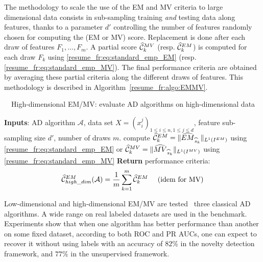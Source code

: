 %
The methodology to scale the use of the EM and MV criteria to large dimensional data consists in sub-sampling training \emph{and} testing data along features, thanks to a parameter $d'$ controlling the number of features randomly chosen for computing the (EM or MV) score. Replacement is done after each draw of features $F_1,\ldots,F_{m}$. A partial score $\widehat {\mathcal{C}}_k^{MV}$ (resp. $\widehat {\mathcal{C}}_k^{EM}$) is computed for each draw $F_k$ using \eqref{resume_fr:eq:standard_emp_EM} (resp. \eqref{resume_fr:eq:standard_emp_MV}). The final performance criteria are obtained by averaging these partial criteria along the different draws of features. This methodology is described in Algorithm~\ref{resume_fr:algo:EMMV}.
%
\begin{algorithm}[!tbh]
\caption{~~High-dimensional EM/MV: evaluate AD algorithms on high-dimensional data}
\label{resume_fr:algo:EMMV}
\begin{algorithmic}
  \STATE \textbf{Inputs}: AD algorithm $\mathcal{A}$, data set $X = (x^j_i)_{1 \le i \le n, 1 \le j \le d }$, feature sub-sampling size $d'$, number of draws $m$.
    \STATE compute $\widehat{\mathcal{C}}_k^{EM} = \| \widehat{EM}_{\widehat s_k} \|_{L^1(I^{EM})}$ using \eqref{resume_fr:eq:standard_emp_EM} or $\widehat{\mathcal{C}}_k^{MV} = \| \widehat{MV}_{\widehat s_k} \|_{L^1(I^{MV})}$ using \eqref{resume_fr:eq:standard_emp_MV}
  \ENDFOR 
  \STATE \textbf{Return} performance criteria: $$\widehat{\mathcal{C}}^{EM}_{high\_dim} (\mathcal{A})= \frac{1}{m} \sum_{k=1}^m\widehat {\mathcal{C}}_k^{EM} \text{~~~~(idem for MV)}$$
\end{algorithmic}
\end{algorithm}

Low-dimensional and high-dimensional EM/MV are tested \wrt~three classical AD algorithms. A wide range on real labeled datasets are used in the benchmark.
Experiments show that when one algorithm has %
better performance than another on some fixed dataset, according to both ROC and PR AUCs, one can expect to recover it without using labels with an accuracy of $82\%$ in the novelty detection framework, and $77\%$ in the unsupervised framework.


